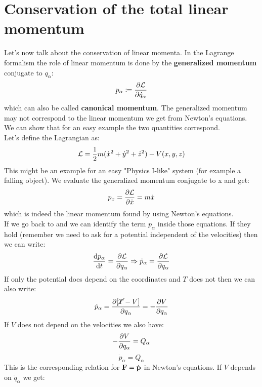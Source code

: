\section{Conservation of the total linear momentum}
Let's now talk about the conservation of linear momenta. In the Lagrange formalism the role of linear momentum is done by the \textbf{generalized momentum} conjugate to $q_{\alpha}$:
\begin{equation}
    p_{\alpha} \defineeq \pdv{\lagr}{\dot{q}_{\alpha}}
\end{equation}
which can also be called \textbf{canonical momentum}. The generalized momentum may not correspond to the linear momentum we get from Newton's equations. We can show that for an easy example the two quantities correspond.\\
Let's define the Lagrangian as:
\begin{equation}
    \mathcal{L} = \dfrac{1}{2}m(\dot{x}^2 + \dot{y}^2 + \dot{z}^2) - V(x,y,z)
\end{equation}
This might be an example for an easy "Physics I-like" system (for example a falling object). We evaluate the generalized momentum conjugate to x and get:
\begin{equation}
    p_x = \pdv{ \lagr}{ \dot{x}} = m\dot{x}
\end{equation}
which is indeed the linear momentum found by using Newton's equations.\\
If we go back to \eleref\;and \lagrangeref\;we can identify the term $p_{\alpha}$ inside those equations. If they hold (remember we need to ask for a potential independent of the velocities) then we can write:
\begin{equation}
    \dfrac{\dd{p_{\alpha}}}{\dd{t}} = \pdv{\lagr}{q_{\alpha}} \Rightarrow \dot{p}_{\alpha} = \pdv{\lagr}{q_{\alpha}}
\end{equation}
If only the potential does depend on the coordinates and $T$ does not then we can also write:
\begin{equation}
    \dot{p}_{\alpha} = \pdv{[\cancel{T}-V]}{q_{\alpha}} = -\pdv{V}{q_{\alpha}}
\end{equation}
If $V$ does not depend on the velocities we also have:
\begin{equation}
    -\pdv{V}{q_{\alpha}} = Q_{\alpha}
\end{equation}
\begin{equation}
    \boxed{\dot{p}_{\alpha} = Q_{\alpha}}
\end{equation}
This is the corresponding relation for $\vb{F} = \dot{\vb{p}}$ in Newton's equations. If $V$ depends on $\dot{q}_{\alpha}$ we get:
